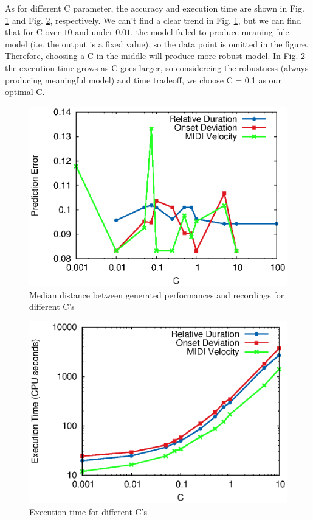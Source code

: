 As for different C parameter, the accuracy and execution time are shown in Fig. \ref{fig:c_accu} and Fig. \ref{fig:c_time}, respectively. We can't find a clear trend in Fig. \ref{fig:c_accu}, but we can find that for C over $10$ and under $0.01$, the model failed to produce meaning fule model (i.e. the output is a fixed value), so the data point is omitted in the figure. Therefore, choosing a C in the middle will produce more robust model. In Fig. \ref{fig:c_time} the execution time grows as C goes larger, so considereing the robustness (always producing meaningful model) and time tradeoff, we choose C = 0.1 as our optimal C.

\begin{figure}[tp]
   \begin{center}
      \includegraphics[width=\textwidth]{fig/C_accu}

   \end{center}
   \caption{Median distance between generated performances and recordings for different C's}
   \label{fig:c_accu}
\end{figure}
\begin{figure}[tp]
   \begin{center}
      \includegraphics[width=\textwidth]{fig/C_time}
   \end{center}
   \caption{Execution time for different C's}
   \label{fig:c_time}
\end{figure}
